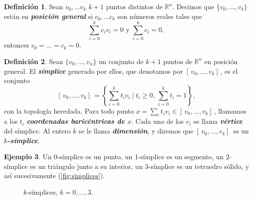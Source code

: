 \documentclass[10pt]{report}
\newcommand{\R}{\mathbb{R}}
\newcommand{\enfatiza}[1]{\textbf{\textit{#1}}}
\theoremstyle{definition}
\newtheorem{defin}{Definición}[section]
\newtheorem{eje}[defin]{Ejemplo}
\begin{document}
\begin{defin}%
Sean $v_0,\dots v_k$ $k+1$ puntos distintos de $\R^n$. Decimos que $\{ v_0,\dots ,v_k\}$ están en \enfatiza{posición general} si $c_0,\dots c_k$ son números reales tales que  $$\sum_{i=0}^{k}c_iv_i=0 \text{ y } \sum_{i=0}^kc_i=0,$$ entonces $c_0=\dots =c_k=0$.
\end{defin}


\begin{defin}%
Sean $\{ v_0,\dots ,v_n\}$ un conjunto de $k+1$ puntos de $\R^n$ en posición general. El \enfatiza{símplice} generado por ellos, que denotamos por $[ \, v_0,\dots ,v_k ] \,$, es el conjunto $$[ \, v_0,\dots ,v_k] \, =\left\{  \sum_{i=0}^{k}t_iv_i \mid t_i\geq 0,\, \sum_{i=0}^{k}t_i=1 \right\}, $$ con la topología heredada. Para todo punto $x=\sum_it_iv_i\in [ \, v_0,\dots ,v_k] \,$, llamamos a los $t_i$ \enfatiza{coordenadas baricéntricas de $x$}. Cada uno de los $v_i$ se llama \enfatiza{vértice} del símplice. Al entero $k$ se le llama \enfatiza{dimensión}, y diremos que $[ \, v_0,\dots ,v_k] \,$ es un \enfatiza{$k$-símplice}. 
\end{defin}

\begin{eje}
Un $0$-símplice es un punto, un 1-símplice es un segmento, un $2$-símplice es un triángulo junto a su interior, un $3$-símplice es un tetraedro sólido, y así sucesivamente (\autoref{fig:simplices}).
\end{eje}

\begin{figure}
\centering
{}
\caption{$k$-símplices, $k=0,\dots ,3$.\label{fig:simplices}}
\end{figure}
\end{document}
